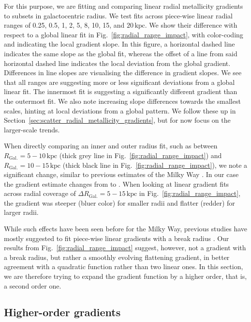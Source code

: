 \documentclass[fleqn,usenatbib]{mnras}
\begin{document}
For this purpose, we are fitting and comparing linear radial metallicity gradients to subsets in galactocentric radius. We test fits across piece-wise linear radial ranges of 0.25, 0.5, 1, 2, 5, 8, 10, 15, and $20\,\mathrm{kpc}$. We show their difference with respect to a global linear fit in Fig.~\ref{fig:radial_range_impact}, with color-coding and indicating the local gradient slope. In this figure, a horizontal dashed line indicates the same slope as the global fit, whereas the offset of a line from said horizontal dashed line indicates the local deviation from the global gradient. Differences in line slopes are visualising the difference in gradient slopes. We see that all ranges are suggesting more or less significant deviations from a global linear fit. The innermost fit is suggesting a significantly different gradient than the outermost fit. We also note increasing slope differences towards the smallest scales, hinting at local deviations from a global pattern. We follow these up in Section~\ref{sec:scatter_radial_metallicity_gradients}, but for now focus on the larger-scale trends.

When directly comparing an inner and outer radius fit, such as between $R_\mathrm{Gal.} = 5-10\,\mathrm{kpc}$ (thick grey line in Fig.~\ref{fig:radial_range_impact}) and $R_\mathrm{Gal.} = 10-15\,\mathrm{kpc}$ (thick black line in Fig.~\ref{fig:radial_range_impact}), we note a significant change, similar to previous estimates of the Milky Way \citep[e.g.][]{Yong2012, Lemasle2008}. In our case the gradient estimate changes from  to . When looking at linear gradient fits across radial coverage of $\Delta R_\mathrm{Gal.} = 5-15\,\mathrm{kpc}$ in Fig.~\ref{fig:radial_range_impact}, the gradient was steeper (bluer color) for smaller radii and flatter (redder) for larger radii.

While such effects have been seen before for the Milky Way, previous studies have mostly suggested to fit piece-wise linear gradients with a break radius \citep[e.g.][]{Andrievsky2002, Yong2012, Boeche2013, Hayden2014, Anders2017, Donor2020}. Our results from Fig.~\ref{fig:radial_range_impact} suggest, however, not a gradient with a break radius, but rather a smoothly evolving flattening gradient, in better agreement with a quadratic function rather than two linear ones. In this section, we are therefore trying to expand the gradient function by a higher order, that is, a second order one.

\subsection{Higher-order gradients} \label{sec:non-linear_component}
\end{document}
